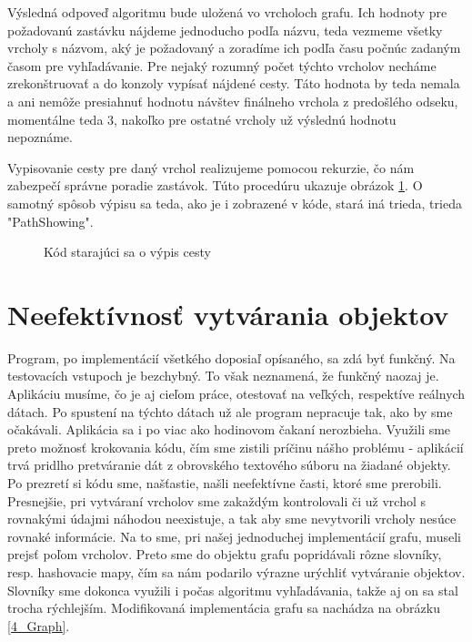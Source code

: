 Výsledná odpoveď algoritmu bude uložená vo vrcholoch grafu. Ich hodnoty pre požadovanú zastávku nájdeme jednoducho podľa názvu, teda vezmeme všetky vrcholy s názvom, aký je požadovaný a zoradíme ich podľa času počnúc zadaným časom pre vyhľadávanie. Pre nejaký rozumný počet týchto vrcholov necháme zrekonštruovať a do konzoly vypísať nájdené cesty. Táto hodnota by teda nemala a ani nemôže presiahnuť hodnotu návštev finálneho vrchola z predošlého odseku, momentálne teda $3$, nakoľko pre ostatné vrcholy už výslednú hodnotu nepoznáme.\newline

Vypisovanie cesty pre daný vrchol realizujeme pomocou rekurzie, čo nám zabezpečí správne poradie zastávok. Túto procedúru ukazuje obrázok \ref{PathShowing}. O samotný spôsob výpisu sa teda, ako je i zobrazené v kóde, stará iná trieda, trieda "PathShowing".\newline

\begin{figure}[H]
  \caption{Kód starajúci sa o výpis cesty}
  \label{PathShowing}
\end{figure}


\section{Neefektívnosť vytvárania objektov}

Program, po implementácií všetkého doposiaľ opísaného, sa zdá byť funkčný. Na testovacích vstupoch je bezchybný. To však neznamená, že funkčný naozaj je. Aplikáciu musíme, čo je aj cieľom práce, otestovať na veľkých, respektíve reálnych dátach. Po spustení na týchto dátach už ale program nepracuje tak, ako by sme očakávali. Aplikácia sa i po viac ako hodinovom čakaní nerozbieha. Využili sme preto možnosť krokovania kódu, čím sme zistili príčinu nášho problému - aplikácií trvá pridlho pretváranie dát z obrovského textového súboru na žiadané objekty. Po prezretí si kódu sme, našťastie, našli neefektívne časti, ktoré sme prerobili. Presnejšie, pri vytváraní vrcholov sme zakaždým kontrolovali či už vrchol s rovnakými údajmi náhodou neexistuje, a tak aby sme nevytvorili vrcholy nesúce rovnaké informácie. Na to sme, pri našej jednoduchej implementácií grafu, museli prejsť poľom vrcholov. Preto sme do objektu grafu popridávali rôzne slovníky, resp. hashovacie mapy, čím sa nám podarilo výrazne urýchliť vytváranie objektov. Slovníky sme dokonca využili i počas algoritmu vyhľadávania, takže aj on sa stal trocha rýchlejším. Modifikovaná implementácia grafu sa nachádza na obrázku \ref{4_Graph}.\newline

